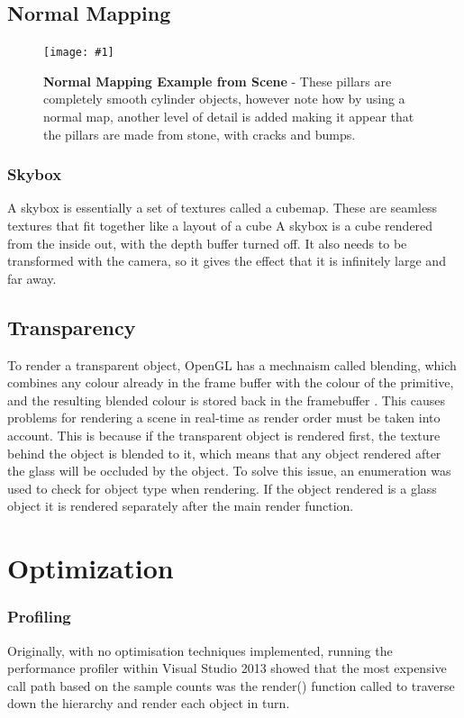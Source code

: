 \documentclass[conference]{acmsiggraph}
\newcommand{\figuremacroW}[4]{
	\begin{figure}[h] %
		\centering
		\texttt{[image: \#1]}
		\caption[#2]{\textbf{#2} - #3}
		\label{fig:#1}
	\end{figure}
}
\begin{document}
\subsection{Normal Mapping}
\figuremacroW
{normalMap}
{Normal Mapping Example from Scene}
{These pillars are completely smooth cylinder objects, however note how by using a normal map, another level of detail is added making it appear that the pillars are made from stone, with cracks and bumps.}
{1.0}

\subsubsection{Skybox}
A skybox is essentially a set of textures called a cubemap. These are seamless textures that fit together like a layout of a cube
A skybox is a cube rendered from the inside out, with the depth buffer turned off. It also needs to be transformed with the camera, so it gives the effect that it is infinitely large and far away.

\subsection{Transparency}

To render a transparent object, OpenGL has a mechnaism called blending, which combines any colour already in the frame buffer with the colour of the primitive, and the resulting blended colour is stored back in the framebuffer \cite{openGLBlend}. This causes problems for rendering a scene in real-time as render order must be taken into account. This is because if the transparent object is rendered first, the texture behind the object is blended to it, which means that any object rendered after the glass will be occluded by the object.
To solve this issue, an enumeration was used to check for object type when rendering. If the object rendered is a glass object it is rendered separately after the main render function.

\section{Optimization}

\subsubsection{Profiling}
Originally, with no optimisation techniques implemented, running the performance profiler within Visual Studio 2013 showed that the most expensive call path based on the sample counts was the render() function called to traverse down the hierarchy and render each object in turn.
\end{document}
